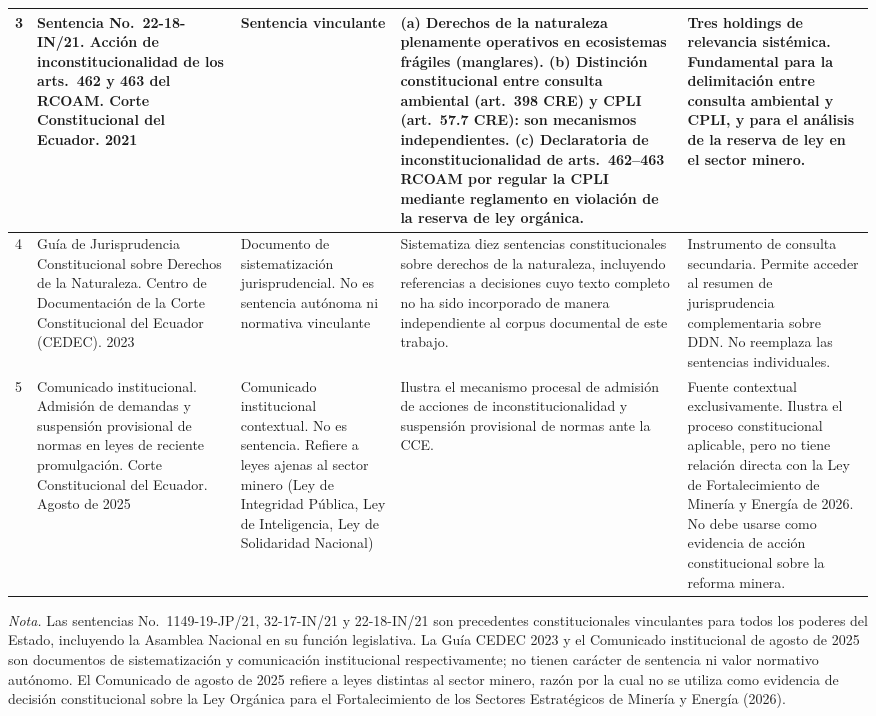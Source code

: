 \begin{longtable}{|p{}|p{}|p{}|p{}|p{}|}
3 &
Sentencia No.\ 22-18-IN/21. Acción de inconstitucionalidad de los arts.\ 462 y 463 del RCOAM. Corte Constitucional del Ecuador. 2021 &
Sentencia vinculante &
(a) Derechos de la naturaleza plenamente operativos en ecosistemas frágiles (manglares). (b) Distinción constitucional entre consulta ambiental (art.\ 398 CRE) y CPLI (art.\ 57.7 CRE): son mecanismos independientes. (c) Declaratoria de inconstitucionalidad de arts.\ 462--463 RCOAM por regular la CPLI mediante reglamento en violación de la reserva de ley orgánica. &
Tres holdings de relevancia sistémica. Fundamental para la delimitación entre consulta ambiental y CPLI, y para el análisis de la reserva de ley en el sector minero. \\
\hline

4 &
Guía de Jurisprudencia Constitucional sobre Derechos de la Naturaleza. Centro de Documentación de la Corte Constitucional del Ecuador (CEDEC). 2023 &
Documento de sistematización jurisprudencial. No es sentencia autónoma ni normativa vinculante &
Sistematiza diez sentencias constitucionales sobre derechos de la naturaleza, incluyendo referencias a decisiones cuyo texto completo no ha sido incorporado de manera independiente al corpus documental de este trabajo. &
Instrumento de consulta secundaria. Permite acceder al resumen de jurisprudencia complementaria sobre DDN. No reemplaza las sentencias individuales. \\
\hline

5 &
Comunicado institucional. Admisión de demandas y suspensión provisional de normas en leyes de reciente promulgación. Corte Constitucional del Ecuador. Agosto de 2025 &
Comunicado institucional contextual. No es sentencia. Refiere a leyes ajenas al sector minero (Ley de Integridad Pública, Ley de Inteligencia, Ley de Solidaridad Nacional) &
Ilustra el mecanismo procesal de admisión de acciones de inconstitucionalidad y suspensión provisional de normas ante la CCE. &
Fuente contextual exclusivamente. Ilustra el proceso constitucional aplicable, pero no tiene relación directa con la Ley de Fortalecimiento de Minería y Energía de 2026. No debe usarse como evidencia de acción constitucional sobre la reforma minera. \\
\hline

\end{longtable}
\endgroup

\noindent\textit{Nota.} Las sentencias No.\ 1149-19-JP/21, 32-17-IN/21 y 22-18-IN/21 son precedentes constitucionales vinculantes para todos los poderes del Estado, incluyendo la Asamblea Nacional en su función legislativa. La Guía CEDEC 2023 y el Comunicado institucional de agosto de 2025 son documentos de sistematización y comunicación institucional respectivamente; no tienen carácter de sentencia ni valor normativo autónomo. El Comunicado de agosto de 2025 refiere a leyes distintas al sector minero, razón por la cual no se utiliza como evidencia de decisión constitucional sobre la Ley Orgánica para el Fortalecimiento de los Sectores Estratégicos de Minería y Energía (2026).
